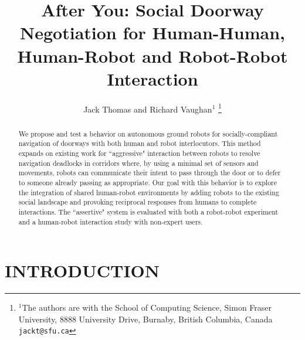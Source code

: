 \documentclass[letterpaper, 10 pt, conference]{ieeeconf}  %
\title{\LARGE \bf
After You: Social Doorway Negotiation for Human-Human, Human-Robot and Robot-Robot Interaction
}
\author{Jack Thomas and Richard Vaughan$^{1}$%
\thanks{$^{1}$The authors are with the School of Computing Science, Simon Fraser University, 8888 University Drive, Burnaby, British Columbia, Canada
        {\tt\small jackt@sfu.ca}}%
}
\begin{document}
\maketitle
\thispagestyle{empty}
\pagestyle{empty}


\begin{abstract}

We propose and test a behavior on autonomous ground robots for socially-compliant navigation of doorways with both human and robot interlocutors. This method expands on existing work for ``aggressive" interaction between robots to resolve navigation deadlocks in corridors where, by using a minimal set of sensors and movements, robots can communicate their intent to pass through the door or to defer to someone already passing as appropriate. Our goal with this behavior is to explore the integration of shared human-robot environments by adding robots to the existing social landscape and provoking reciprocal responses from humans to complete interactions. The ``assertive" system is evaluated with both a robot-robot experiment and a human-robot interaction study with non-expert users.

\end{abstract}


\section{INTRODUCTION}


\end{document}
